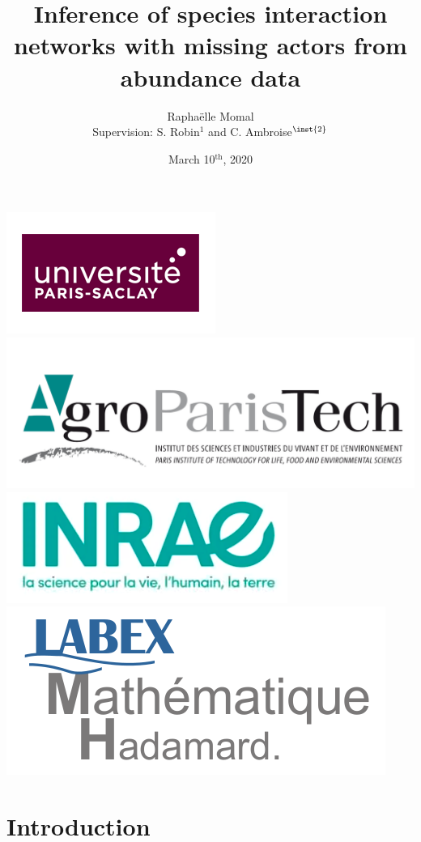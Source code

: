 \documentclass[11pt]{beamer}
\title{Inference of species interaction networks with missing actors from abundance data}
\author{Raphaëlle Momal\\
\tiny{Supervision:  S. Robin$^{{1}}$ and C. Ambroise$^{\inst{2}}$  }}
\institute[]
{
  \inst{1}%
  UMR AgroParisTech / INRA MIA-Paris \\
  \inst{2}%
  LaMME, Evry
  }
\date{March 10$^{\text{th}}$, 2020}
\begin{document}
\begin{frame}
    \titlepage
    \begin{center}
    \includegraphics[width=0.15\linewidth]{images/UPsaclay.png}
    \includegraphics[width=0.2\linewidth]{images/agro.PNG}\hspace{0.1cm}
	\includegraphics[width=0.15\linewidth]{images/inrae.png}\hspace{0.15cm}
	\includegraphics[width=0.17\linewidth]{images/lmh.png}\hspace{0.15cm}
\end{center}
\end{frame}



\section{Introduction}
\end{document}
